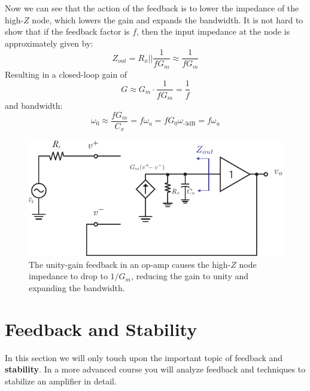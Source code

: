 Now we can see that the action of the feedback is to lower the impedance of the high-$Z$ node, which lowers the gain and expands the bandwidth. It is not hard to show that if the feedback factor is $f$, then the input impedance at the node is approximately given by:
    \begin{equation}
        Z_{out} = R_x || \frac{1}{f G_m} \approx \frac{1}{f G_m}
    \end{equation}
Resulting in a closed-loop gain of 
    \begin{equation}
        G \approx G_m \cdot \frac{1}{f G_m} = \frac{1}{f}
    \end{equation}
and bandwidth:
    \begin{equation}
        \omega_0 \approx \frac{f G_m}{C_x } = f \omega_u  = f G_0 \omega_{\text{-3dB}} = f \omega_u  
    \end{equation}
\begin{figure}[tb]
\centering
\includegraphics[scale=1]{opamp_model_fb_unity_label}
\caption{The unity-gain feedback in an op-amp causes the high-$Z$ node impedance to drop to $1/G_m$, reducing the gain to unity and expanding the bandwidth.}
\label{fig:opamp_model_fb_unity_label}
\end{figure}
\newpage
\section{Feedback and Stability}
\label{sec:opamp_stability}
In this section we will only touch upon the important topic of feedback and \textbf{stability}. In a more advanced course you will analyze feedback and techniques to stabilize an amplifier in detail.

